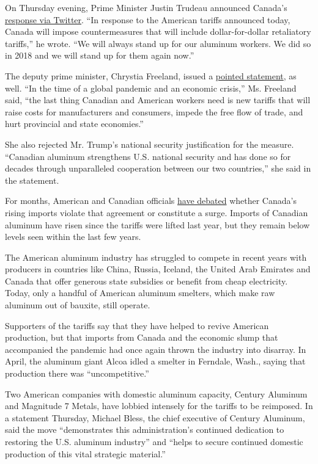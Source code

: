On Thursday evening, Prime Minister Justin Trudeau announced Canada's
\href{https://twitter.com/JustinTrudeau/status/1291521260044931073}{response
via Twitter}. ``In response to the American tariffs announced today,
Canada will impose countermeasures that will include dollar-for-dollar
retaliatory tariffs,'' he wrote. ``We will always stand up for our
aluminum workers. We did so in 2018 and we will stand up for them again
now.''

The deputy prime minister, Chrystia Freeland, issued a
\href{https://deputypm.canada.ca/en/news/statements/2020/08/06/statement-deputy-prime-minister-us-tariffs-imports-canadian-aluminum}{pointed
statement}, as well. ``In the time of a global pandemic and an economic
crisis,'' Ms. Freeland said, ``the last thing Canadian and American
workers need is new tariffs that will raise costs for manufacturers and
consumers, impede the free flow of trade, and hurt provincial and state
economies.''

She also rejected Mr. Trump's national security justification for the
measure. ``Canadian aluminum strengthens U.S. national security and has
done so for decades through unparalleled cooperation between our two
countries,'' she said in the statement.

For months, American and Canadian officials
\href{https://www.nytimes3xbfgragh.onion/2020/06/23/business/economy/usmca-canada-aluminum-tariffs.html}{have
debated} whether Canada's rising imports violate that agreement or
constitute a surge. Imports of Canadian aluminum have risen since the
tariffs were lifted last year, but they remain below levels seen within
the last few years.

The American aluminum industry has struggled to compete in recent years
with producers in countries like China, Russia, Iceland, the United Arab
Emirates and Canada that offer generous state subsidies or benefit from
cheap electricity. Today, only a handful of American aluminum smelters,
which make raw aluminum out of bauxite, still operate.

Supporters of the tariffs say that they have helped to revive American
production, but that imports from Canada and the economic slump that
accompanied the pandemic had once again thrown the industry into
disarray. In April, the aluminum giant Alcoa idled a smelter in
Ferndale, Wash., saying that production there was ``uncompetitive.''

Two American companies with domestic aluminum capacity, Century Aluminum
and Magnitude 7 Metals, have lobbied intensely for the tariffs to be
reimposed. In a statement Thursday, Michael Bless, the chief executive
of Century Aluminum, said the move ``demonstrates this administration's
continued dedication to restoring the U.S. aluminum industry'' and
``helps to secure continued domestic production of this vital strategic
material.''

